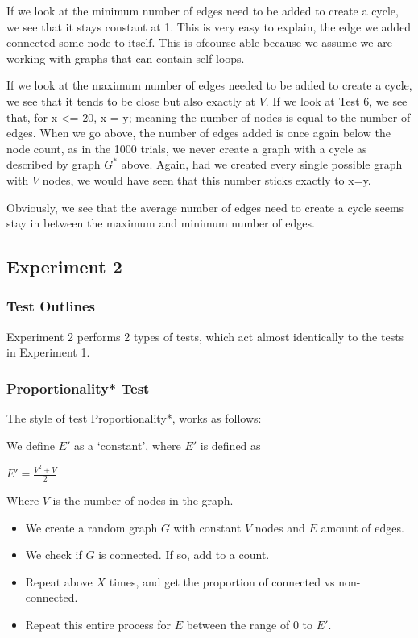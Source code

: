 \documentclass[12pt]{article}
\begin{document}
If we look at the minimum number of edges need to be added to create a cycle, we see that it stays constant at 1. This is very easy to explain, the edge we added connected some node to itself. This is ofcourse able because we assume we are working with graphs that can contain self loops.

If we look at the maximum number of edges needed to be added to create a cycle, we see that it tends to be close but also exactly at $V$. If we look at Test 6, we see that, for x <= 20, x = y; meaning the number of nodes is equal to the number of edges. When we go above, the number of edges added is once again below the node count, as in the 1000 trials, we never create a graph with a cycle as described by graph $G^{*}$ above. Again, had we created every single possible graph with $V$ nodes, we would have seen that this number sticks exactly to x=y.

Obviously, we see that the average number of edges need to create a cycle seems stay in between the maximum and minimum number of edges.

%
%
%
%
\newpage
\subsection{Experiment 2}


\subsubsection{Test Outlines}

Experiment 2 performs 2 types of tests, which act almost identically to the tests in Experiment 1.

\subsubsection*{Proportionality* Test}
The style of test Proportionality*, works as follows:

We define $E'$ as a `constant', where $E'$ is defined as
\begin{center}
    $E' = \frac{V^2 + V}{2}$
\end{center}

Where $V$ is the number of nodes in the graph.

\begin{itemize}
    \item We create a random graph $G$ with constant $V$ nodes and $E$ amount of edges.
    \item We check if $G$ is connected. If so, add to a count.
    \item Repeat above $X$ times, and get the proportion of connected vs non-connected.
    \item Repeat this entire process for $E$ between the range of 0 to $E'$.
\end{itemize}
\end{document}

